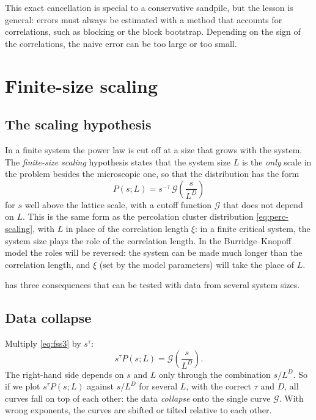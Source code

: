 This exact cancellation is special to a conservative sandpile, but the lesson is general: errors must always be estimated with a method
that accounts for correlations, such as blocking or the block bootstrap. Depending on the sign of the correlations, the naive error can be
too large or too small.

\section{Finite-size scaling}
\label{sec:fss}

\subsection{The scaling hypothesis}

In a finite system the power law is cut off at a size that grows with the system. The \emph{finite-size scaling} hypothesis states that
the system size $L$ is the \emph{only} scale in the problem besides the microscopic one, so that the distribution has the form
\begin{equation}
  P(s;L) = s^{-\tau}\,\mathcal G\!\left(\frac{s}{L^{D}}\right)
  \label{eq:fss3}
\end{equation}
for $s$ well above the lattice scale, with a cutoff function $\mathcal G$ that does not depend on $L$. This is the same form as the
percolation cluster distribution \cref{eq:perc-scaling}, with $L$ in place of the correlation length $\xi$: in a finite critical system,
the system size plays the role of the correlation length. In the Burridge--Knopoff model the roles will be reversed: the system can be made
much longer than the correlation length, and $\xi$ (set by the model parameters) will take the place of $L$.

 has three consequences that can be tested with data from several system sizes.

\subsection{Data collapse}

Multiply \cref{eq:fss3} by $s^\tau$:
\begin{equation}
  s^{\tau}P(s;L) = \mathcal G\!\left(\frac{s}{L^{D}}\right).
\end{equation}
The right-hand side depends on $s$ and $L$ only through the combination $s/L^D$. So if we plot $s^\tau P(s;L)$ against $s/L^{D}$ for
several $L$, with the correct $\tau$ and $D$, all curves fall on top of each other: the data \emph{collapse} onto the single curve
$\mathcal G$. With wrong exponents, the curves are shifted or tilted relative to each other.

